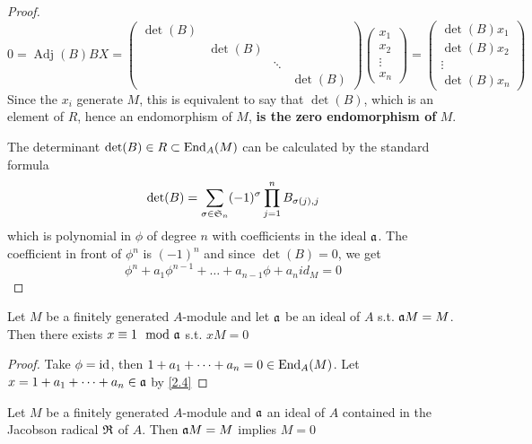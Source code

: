\documentclass[11pt]{article}
\DeclareMathOperator{\Adj}{Adj}
\begin{document}
\begin{proof}
\begin{equation*}
0=\Adj(B)BX=
\begin{pmatrix}
\det(B)&&&\\
&\det(B)&&\\
&&\ddots&\\
&&&\det(B)
\end{pmatrix}
\begin{pmatrix}
x_1\\x_2\\\vdots\\x_n
\end{pmatrix}=
\begin{pmatrix}
\det(B)x_1\\\det(B)x_2\\\vdots\\\det(B)x_n
\end{pmatrix}
\end{equation*}
Since the \(x_i\) generate \(M\), this is equivalent to say that \(\det(B)\), which is an element
of \(R\), hence an endomorphism of \(M\), \textbf{is the zero endomorphism of} \(M\).

The determinant \(\det(B)\in R\subset\operatorname{End}_A(M)\) can be calculated by the standard formula
\begin{equation*}
\det(B)=\sum_{\sigma\in \mathfrak{S}_n}(-1)^\sigma\prod_{j=1}^nB_{\sigma(j),j}
\end{equation*}
which is polynomial in \(\phi\) of degree \(n\) with coefficients in the ideal \(\mathfrak{a}\). The coefficient
in front of \(\phi^n\) is \((-1)^n\) and since \(\det(B)=0\), we get
\begin{equation*}
\phi^n+a_1\phi^{n-1}+\dots+a_{n-1}\phi+a_n id_M=0
\end{equation*}
\end{proof}

\begin{corollary}[]
\label{2.5}
Let \(M\) be a finitely generated \(A\)-module and let \(\mathfrak{a}\) be an ideal of \(A\)
s.t. \(\mathfrak{a} M=M\). Then there exists \(x\equiv 1\mod{\mathfrak{a}}\)  s.t. \(xM=0\)
\end{corollary}

\begin{proof}
Take \(\phi=\operatorname{id}\), then \(1+a_1+\dots+a_n=0\in\operatorname{End}_A(M)\). Let
\(x=1+a_1+\dots+a_n\in\mathfrak{a}\)
by \ref{2.4}
\end{proof}

\begin{proposition}
\label{2.6}
Let \(M\) be a finitely generated \(A\)-module and \(\mathfrak{a}\) an ideal of \(A\) contained in the
Jacobson radical \(\mathfrak{R}\) of \(A\). Then \(\mathfrak{a} M=M\) implies \(M=0\)
\end{proposition}
\end{document}
